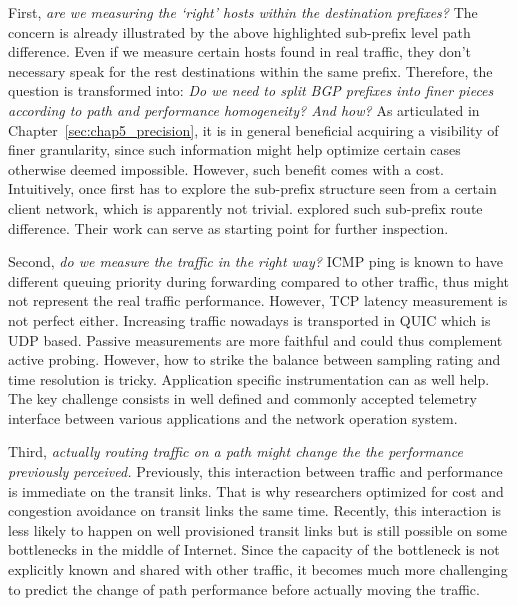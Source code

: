 First, \textit{are we measuring the `right' hosts within the destination prefixes?} The concern is already illustrated by the above highlighted sub-prefix level path difference. Even if we measure certain hosts found in real traffic, they don't necessary speak for the rest destinations within the same prefix.
Therefore, the question is transformed into: \textit{Do we need to split BGP prefixes into finer pieces according to path and performance homogeneity? And how?}
As articulated in Chapter~\ref{sec:chap5_precision}, it is in general beneficial acquiring a visibility of finer granularity, since such information might help optimize certain cases otherwise deemed impossible.
However, such benefit comes with a cost. Intuitively, once first has to explore the sub-prefix structure seen from a certain client network, which is apparently not trivial.
\citet{Lee2016} explored such sub-prefix route difference. Their work can serve as starting point for further inspection.

Second, \textit{do we measure the traffic in the right way?} ICMP ping is known to have different queuing priority during forwarding compared to other traffic, thus might not represent the real traffic performance. However, TCP latency measurement is not perfect either. Increasing traffic nowadays is transported in QUIC which is UDP based.
Passive measurements are more faithful and could thus complement active probing. However, how to strike the balance between sampling rating and time resolution is tricky.
Application specific instrumentation can as well help. The key challenge consists in well defined and commonly accepted telemetry interface between various applications and the network operation system.

Third, \textit{actually routing traffic on a path might change the the performance previously perceived.} Previously, this interaction between traffic and performance is immediate on the transit links. That is why researchers optimized for cost and congestion avoidance on transit links the same time. Recently, this interaction is less likely to happen on well provisioned transit links but is still possible on some bottlenecks in the middle of Internet. Since the capacity of the bottleneck is not explicitly known and shared with other traffic, it becomes much more challenging to predict the change of path performance before actually moving the traffic.  

